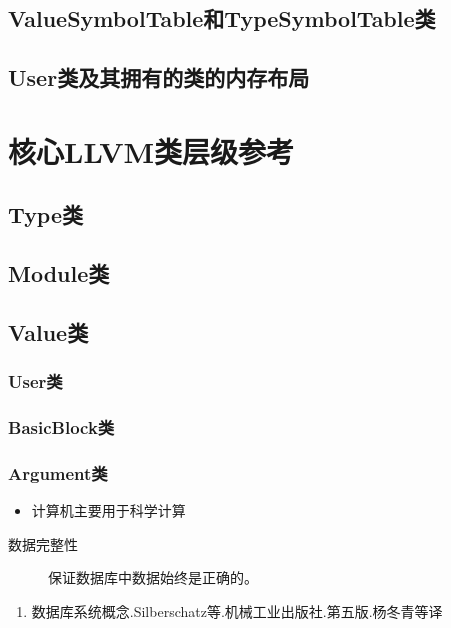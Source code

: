 \documentclass[12pt,a4paper]{article}
\begin{document}
\subsection{ValueSymbolTable和TypeSymbolTable类}

\subsection{User类及其拥有的类的内存布局}

\section{核心LLVM类层级参考}

\subsection{Type类}

\subsection{Module类}

\subsection{Value类}

\subsubsection{User类}






\subsubsection{BasicBlock类}

\subsubsection{Argument类}


\begin{itemize}
\item 计算机主要用于科学计算
\end{itemize}

\begin{description}
\item[数据完整性] 保证数据库中数据始终是正确的。
\end{description}

\begin{enumerate}
\item 数据库系统概念.Silberschatz等.机械工业出版社.第五版.杨冬青等译
\end{enumerate}
\end{document}
